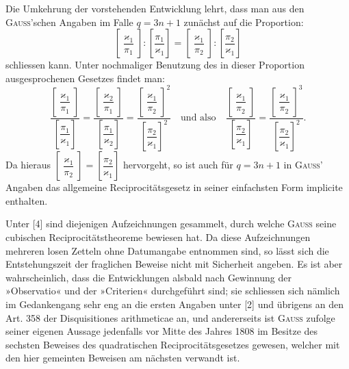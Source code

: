 
Die Umkehrung der vorstehenden Entwicklung lehrt, dass man aus den \textsc{Gauss}'schen Angaben im
Falle $q=3n+1$ zunächst auf die Proportion:
\[
\left[\dfrac{\varkappa_1}{\pi_1}\right]:\left[\dfrac{\pi_1}{\varkappa_1}\right]=\left[\dfrac{\varkappa_1}{\pi_2}\right]:\left[\dfrac{\pi_2}{\varkappa_1}\right]
\]
schliessen kann. Unter nochmaliger Benutzung des in dieser Proportion ausgesprochenen Gesetzes findet man:
\[
\dfrac{\left[\dfrac{\varkappa_1}{\pi_1}\right]}{\left[\dfrac{\pi_1}{\varkappa_1}\right]}=\dfrac{\left[\dfrac{\varkappa_2}{\pi_1}\right]}{\left[\dfrac{\pi_1}{\varkappa_2}\right]}=\dfrac{\left[\dfrac{\varkappa_1}{\pi_2}\right]^2}{\left[\dfrac{\pi_2}{\varkappa_1}\right]^2}
\quad\text{und also}\quad
\dfrac{\left[\dfrac{\varkappa_1}{\pi_2}\right]}{\left[\dfrac{\pi_2}{\varkappa_1}\right]}=\dfrac{\left[\dfrac{\varkappa_1}{\pi_2}\right]^3}{\left[\dfrac{\pi_2}{\varkappa_1}\right]^2}.
\]
Da hieraus $\left[\dfrac{\varkappa_1}{\pi_2}\right]=\left[\dfrac{\pi_2}{\varkappa_1}\right]$ hervorgeht, so ist auch für $q=3n+1$ in \textsc{Gauss}' Angaben das allgemeine Reciprocitätsgesetz in seiner einfachsten Form implicite enthalten.

Unter [4] sind diejenigen Aufzeichnungen gesammelt, durch welche \textsc{Gauss} seine cubischen Reciprocitätstheoreme bewiesen hat. Da diese Aufzeichnungen mehreren losen Zetteln ohne Datumangabe entnommen sind, so lässt sich die Entstehungszeit der fraglichen Beweise nicht mit Sicherheit angeben. Es ist
aber wahrscheinlich, dass die Entwicklungen alsbald nach Gewinnung der »Observatio« und der »Criterien«
durchgeführt sind; sie schliessen sich nämlich im Gedankengang sehr eng an die ersten Angaben unter [2]
und übrigens an den Art. 358 der Disquisitiones arithmeticae an, und andererseits ist \textsc{Gauss} zufolge seiner
eigenen Aussage jedenfalls vor Mitte des Jahres 1808 im Besitze des sechsten Beweises des quadratischen
Reciprocitätsgesetzes gewesen, welcher mit den hier gemeinten Beweisen am nächsten verwandt ist.

